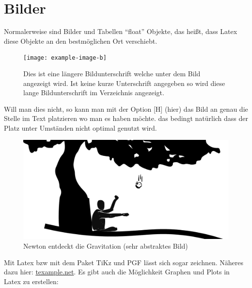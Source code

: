\section{Bilder}
\label{sec:bilder}
Normalerweise sind Bilder und Tabellen "`float"' Objekte, das heißt, dass Latex diese Objekte an den bestmöglichen Ort verschiebt. 
\begin{figure}[H]
	\centering
	\texttt{[image: example-image-b]} 
	\caption[Dies ist eine kürzere Bildunterschrift (Verzeichnis)]{Dies ist eine längere Bildunterschrift welche unter dem Bild angezeigt wird. Ist keine kurze Unterschrift angegeben so wird diese lange Bildunterschrift im Verzeichnis angezeigt.}
	\label{fig:testbild}
\end{figure}
Will man dies nicht, so kann man mit der Option [H] (hier) das Bild an genau die Stelle im Text platzieren wo man es haben möchte. das bedingt natürlich dass der Platz unter Umständen nicht optimal genutzt wird.
\begin{figure}[H]
	\centering
	\includegraphics[width=0.7\linewidth]{bilder/newton}
	\caption{Newton entdeckt die Gravitation (sehr abstraktes Bild)}
	\label{fig:newton}
\end{figure}

Mit Latex bzw mit dem Paket TiKz und PGF lässt sich sogar zeichnen. Näheres dazu hier: \href{http://www.texample.net/tikz/examples/}{texample.net}. Es gibt auch die Möglichkeit Graphen und Plots in Latex zu erstellen:


%
\cleardoublepage